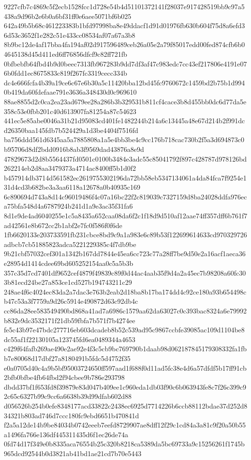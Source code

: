 \documentclass[11pt,a4paper]{article}
\begin{document}
{9227cfb7c4869c5f2ecb1528fcc1d728e54b4d51101372141f28037e917428519bb9c97a5438a9d96b2e6b0a6bf31ff0e6aee5071bf6b025
642a49b5b68c461223383b1bfd97998ba8e49ddacf1d91d01976fb630b604f75d8a6efd36d53c3652f1e282c51e433cc08534af07a67a3b8
8b9bc12de4af17bba4fa194af02d917596489ceb26a05e2a79f85017edd00fed874cfb6b04645138d45d411ed6ff76856dfcf9c82ff721fb
0bfbebfb64fbd4b9d0beec7313fb967283b9dd7df3af47c983edc7cc43ef217806e4191e076b0fdd1ec8675833c819f267fc3319cecc334b
dc4e666fcfa4b39a19ce6c67e6b30a5c11420bba12bd45fc9760672c1459bd2b75b1d9940b419da60fdefaae791e3636a348430d0c969610
88ae8855d2c0ca2ea23ad679ee28a286b3b329531b811cf4cace3b8d455bb0dc6d77da5e358c53e0fbb201c40d613907fa81254a87c54623
441ec5e85abe0046a31b21d95083cd401fe1482244b214a6c13445a48e67d214b2f991dcd26350baa145fdb7b524429a1d3be4404f7516fd
ba756ddd561d6345aa5a7885808a1a5e4bb3be4c9cc176b718cac730b2f5a3d694873c0b95706d8df2bdd0916b8ab3f9569dad43876a8e9d
47829673d2d8b5564437fd0501c0100b3484e3adc55c85041792f897c428787d978126bd262214eb2d8aa3479373a4714ac8400ff5b1d0f2
b457914db3714d561582ec2619755302196da72bb58eb5347134061a4da84fca7f9254e131d4cd3b682be3a3aa6118a12678a0b40935c169
6c890694d743a8d14c96019486f4c07a16bc22f2c819039c7327159d8ba24028ddfa976eca75bfa548d4a6787924b241d1a9e3ac35f31fa6
8d1e9de4ad6040255e1c5a8435a652caa08da6f2c1f18d9d510af12aae74ff357dff6b761f7ad42561e8b672cc2b1abf2e7fc0f586f0f6de
1fb6620133e203733591fb231cbce8bd9c9a1a983e6c89b53f122699614633cd970329726adbcb7cb51885823adca5221229385c4f7db9be
9b21cbf57032cef301a1342b167dd7844e45ea6cc723c77a28ff7be9d50e2a16acf1aeca36e28954d1414cdee69bd605252154aa0c5a5b3b
357c35d7cd7401df9652cef4879f49839c89f0d44ac4aab35f9d4a2a45ec7b98208a60fc303b81ecd24be27a853ce1cd527b194743211c29
248ae4f6c4024ec83da2a7dac3e763b2eab2d18ba8b17ba174dd4c92ce180a93b654498cb47c53a3f7759a9d26c5914e490872d63c92db4c
cc86da28ee583549490bd868a41ad7a6986c1579aa62da63027c0c393bac8324a6e79992b832e9dc3532171f21db59fbfa7b571f7b4274ee
fe5c43b97e47bdc277716eb603dcadeb8b52c539ad95c9867ccbfe39085ac109d1104be8dc55af1f22130105a123745fd6ea0489344a4653
c429f64fafb269ae490e2ae92e4f3c5cb9bc769790b1daab98d062187845179308332fa1fbb7e80068d17dbf27a8180491b5fdc5d4752f35
e0a0705d40c4a9b5bf95003724650ff597aad1f688f0d11ad5fc38e4d6a57dfdf5b17ff91cb2bfb0bfbe4fb64fbd2f94cbee9b786e293798
dbdd37bf1f653fd8f39879e83d047b409ee1c960eda1db03f90c6b063943fe8c7f26c399c92c65c6327b99c9cc6a6638b39d99dfab602d88
d056526b254b0efe8348177acd33822c2438ec6925d7714226b6ccb88112bdae37d252d834321b803ad746d7ccc180fc9ebd6651b470841d
f2a5a12de14b9be84034b0742eeeb7eefd8729907ae8dff12f29c1cd84a3a81c9f20a50b55a1496fa766e136df445311435d6f1ec26de74a
0fd74d17f349e0b8335aca76554b25c320b8218ca5389da5bc69733a9c15256261f1745b965dcd92544b0d3821ab41bd1ae21cd7b70e5443
}
\end{document}
